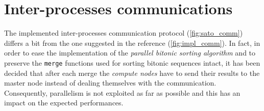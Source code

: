 \documentclass[a4paper,11pt]{article}
\begin{document}
\section{Inter-processes communications}

  The implemented inter-processes communication protocol (\ref{fig:sato_comm}) differs a bit from the one suggested in the reference (\ref{fig:impl_comm}). In fact, in order to ease the implementation of the \textit{parallel bitonic sorting algorithm} and to preserve the \texttt{merge} functions used for sorting bitonic sequences intact, it has been decided that after each merge the \textit{compute nodes} have to send their results to the master node instead of dealing themselves with the communication. Consequently, parallelism is not exploited as far as possible and this has an impact on the expected performances.
\end{document}

